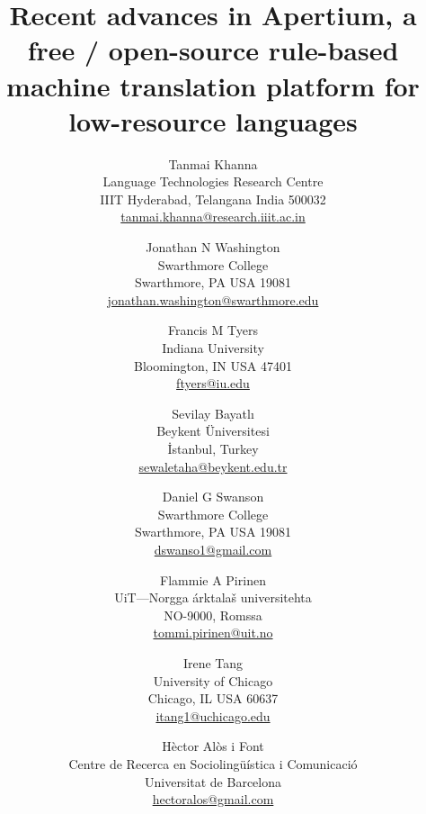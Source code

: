 \documentclass[free]{flammie}
\begin{document}
\title{Recent advances in Apertium, a free / open-source rule-based machine
translation platform for low-resource languages
}




\author{Tanmai Khanna \\
              Language Technologies Research Centre\\
              IIIT Hyderabad, Telangana India 500032\\
              \url{tanmai.khanna@research.iiit.ac.in}
           \and
           Jonathan N Washington \\
              Swarthmore College\\
              Swarthmore, PA USA 19081\\
              \url{jonathan.washington@swarthmore.edu}
           \and
           Francis M Tyers \\
              Indiana University\\
              Bloomington, IN USA 47401\\
              \url{ftyers@iu.edu}
           \and
           Sevilay Bayatlı \\
              Beykent Üniversitesi\\
              İstanbul, Turkey\\
              \url{sewaletaha@beykent.edu.tr}
           \and
           Daniel G Swanson \\
              Swarthmore College\\
              Swarthmore, PA USA 19081\\
              \url{dswanso1@gmail.com}
           \and
           Flammie A Pirinen \\
              UiT---Norgga árktalaš universitehta\\
              NO-9000, Romssa\\
              \url{tommi.pirinen@uit.no}
           \and
           Irene Tang \\
              University of Chicago\\
              Chicago, IL USA 60637\\
              \url{itang1@uchicago.edu}
           \and
           Hèctor {Alòs i Font} \\
              Centre de Recerca en Sociolingüística i Comunicació\\
              Universitat de Barcelona\\
              \url{hectoralos@gmail.com}
}
\end{document}
